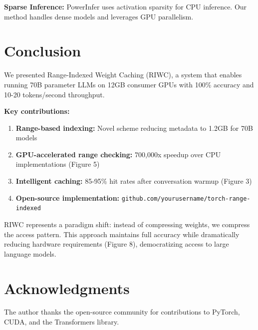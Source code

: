 \documentclass[twocolumn,10pt]{article}
\begin{document}
\textbf{Sparse Inference:} PowerInfer \cite{xue2023powerinfer} uses activation sparsity for CPU inference. Our method handles dense models and leverages GPU parallelism.

\section{Conclusion}

We presented Range-Indexed Weight Caching (RIWC), a system that enables running 70B parameter LLMs on 12GB consumer GPUs with 100\% accuracy and 10-20 tokens/second throughput.

\textbf{Key contributions:}
\begin{enumerate}
    \item \textbf{Range-based indexing:} Novel scheme reducing metadata to 1.2GB for 70B models
    \item \textbf{GPU-accelerated range checking:} 700,000x speedup over CPU implementations (Figure 5)
    \item \textbf{Intelligent caching:} 85-95\% hit rates after conversation warmup (Figure 3)
    \item \textbf{Open-source implementation:} \texttt{github.com/yourusername/torch-range-indexed}
\end{enumerate}

RIWC represents a paradigm shift: instead of compressing weights, we compress the access pattern. This approach maintains full accuracy while dramatically reducing hardware requirements (Figure 8), democratizing access to large language models.

\section*{Acknowledgments}

The author thanks the open-source community for contributions to PyTorch, CUDA, and the Transformers library.
\end{document}
